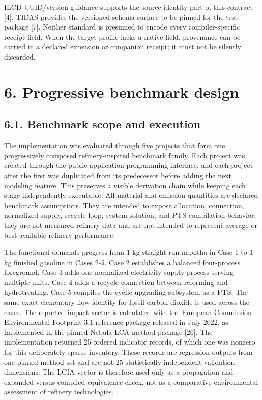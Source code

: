 \documentclass[
  10pt,
  a4paper,
  DIV=11,
  numbers=noendperiod]{scrartcl}
\begin{document}
ILCD UUID/version guidance supports the source-identity part of this
contract {[}4{]}. TIDAS provides the versioned schema surface to be
pinned for the test package {[}7{]}. Neither standard is presumed to
encode every compiler-specific receipt field. When the target profile
lacks a native field, provenance can be carried in a declared extension
or companion receipt; it must not be silently discarded.

\section{6. Progressive benchmark
design}\label{progressive-benchmark-design}

\subsection{6.1. Benchmark scope and
execution}\label{benchmark-scope-and-execution}

The implementation was evaluated through five projects that form one
progressively composed refinery-inspired benchmark family. Each project
was created through the public application programming interface, and
each project after the first was duplicated from its predecessor before
adding the next modeling feature. This preserves a visible derivation
chain while keeping each stage independently executable. All material
and emission quantities are declared benchmark assumptions. They are
intended to expose allocation, connection, normalized-supply,
recycle-loop, system-solution, and PTS-compilation behavior; they are
not measured refinery data and are not intended to represent average or
best-available refinery performance.

The functional demands progress from 1 kg straight-run naphtha in Case 1
to 1 kg finished gasoline in Cases 2-5. Case 2 establishes a balanced
four-process foreground. Case 3 adds one normalized electricity-supply
process serving multiple units. Case 4 adds a recycle connection between
reforming and hydrotreating. Case 5 compiles the cyclic upgrading
subsystem as a PTS. The same exact elementary-flow identity for fossil
carbon dioxide is used across the cases. The reported impact vector is
calculated with the European Commission Environmental Footprint 3.1
reference package released in July 2022, as implemented in the pinned
Nebula LCA method package {[}26{]}. The implementation returned 25
ordered indicator records, of which one was nonzero for this
deliberately sparse inventory. These records are regression outputs from
one pinned method set and are not 25 statistically independent
validation dimensions. The LCIA vector is therefore used only as a
propagation and expanded-versus-compiled equivalence check, not as a
comparative environmental assessment of refinery technologies.
\end{document}
